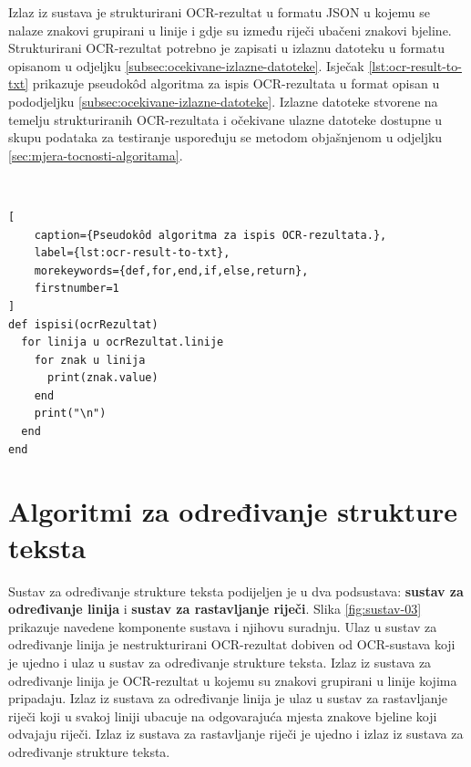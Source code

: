\documentclass[times, utf8, zavrsni]{fer}
\begin{document}
\pagebreak

Izlaz iz sustava je strukturirani OCR-rezultat u
formatu JSON u kojemu se nalaze znakovi grupirani u linije i gdje su između
riječi ubačeni znakovi bjeline. Strukturirani OCR-rezultat potrebno je zapisati
u izlaznu datoteku u formatu opisanom u odjeljku
\ref{subsec:ocekivane-izlazne-datoteke}. Isječak \ref{lst:ocr-result-to-txt}
prikazuje pseudokôd algoritma za ispis OCR-rezultata u format opisan u
pododjeljku \ref{subsec:ocekivane-izlazne-datoteke}. Izlazne datoteke stvorene
na temelju strukturiranih OCR-rezultata i očekivane ulazne datoteke dostupne u
skupu podataka za testiranje uspoređuju se metodom objašnjenom u odjeljku
\ref{sec:mjera-tocnosti-algoritama}.

\

\begin{lstlisting}[
    caption={Pseudokôd algoritma za ispis OCR-rezultata.},
    label={lst:ocr-result-to-txt},
    morekeywords={def,for,end,if,else,return},
    firstnumber=1
]
def ispisi(ocrRezultat)
  for linija u ocrRezultat.linije
    for znak u linija
      print(znak.value)
    end
    print("\n")
  end
end
\end{lstlisting}

















\chapter{Algoritmi za određivanje strukture teksta}
\label{chap:algoritmi-za-odredivanje-strukture-teksta}
Sustav za određivanje strukture teksta podijeljen je u dva podsustava:
\textbf{sustav za određivanje linija} i \textbf{sustav za rastavljanje riječi}.
Slika \ref{fig:sustav-03} prikazuje navedene komponente sustava i njihovu
suradnju. Ulaz u sustav za određivanje linija je nestrukturirani OCR-rezultat
dobiven od OCR-sustava koji je ujedno i ulaz u sustav za određivanje strukture
teksta. Izlaz iz sustava za određivanje linija je OCR-rezultat
u kojemu su znakovi grupirani u linije kojima pripadaju. Izlaz
iz sustava za određivanje linija je ulaz u sustav za rastavljanje riječi koji
u svakoj liniji ubacuje na odgovarajuća mjesta znakove bjeline koji odvajaju
riječi. Izlaz iz sustava za rastavljanje riječi je ujedno i izlaz iz sustava
za određivanje strukture teksta.
\end{document}
